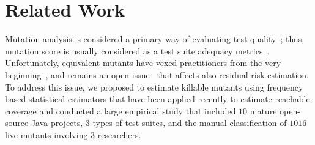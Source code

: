 \documentclass[sigconf,review,anonymous]{acmart}
\begin{document}
\section{Related Work}
Mutation analysis is considered a primary way of evaluating test quality~\cite{papadakis2019mutation};
thus, mutation score is usually considered as a test suite adequacy metrics~\cite{just2014are,andrews2005is,andrews2006using,daran1996software}. 
Unfortunately, equivalent mutants have vexed practitioners from the very beginning~\cite{budd1982two},
and remains an open issue~\cite{madeyski2014overcoming} that affects also residual risk estimation.
%
To address this issue, we proposed to estimate killable mutants using
frequency based statistical estimators that have been applied recently to 
estimate reachable coverage
and conducted a large empirical study that included
$10$ mature open-source Java projects, $3$ types of test suites, and the 
manual classification of $1016$ live mutants involving $3$ researchers.
\end{document}
